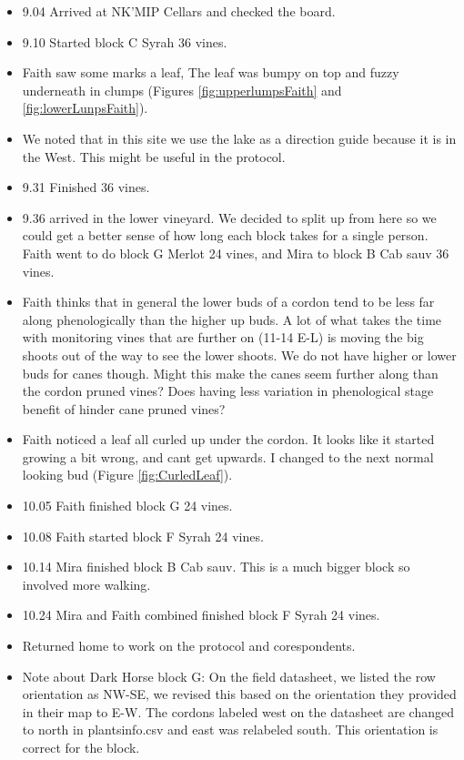 \documentclass[11pt,letter]{article}
\newenvironment{smitemize}{
\begin{itemize}
  \setlength{\itemsep}{0pt}
  \setlength{\parskip}{0.8pt}
  \setlength{\parsep}{0pt}}
{\end{itemize}
}
\begin{document}
\begin{smitemize}
\item 9.04 Arrived at NK'MIP Cellars and checked the board. 
\item 9.10 Started block C Syrah 36 vines.
\item Faith saw some marks a leaf, The leaf was bumpy on top and fuzzy underneath in clumps (Figures \ref{fig:upperlumpsFaith} and \ref{fig:lowerLunpsFaith}).
\item We noted that in this site we use the lake as a direction guide because it is in the West. This might be useful in the protocol. 
\item 9.31 Finished 36 vines.  
\item 9.36 arrived in the lower vineyard. We decided to split up from here so we could get a better sense of how long each block takes for a single person. Faith went to do block G Merlot 24 vines, and Mira to block B Cab sauv 36 vines. 
\item Faith thinks that in general the lower buds of a cordon tend to be less far along phenologically than the higher up buds. A lot of what takes the time with monitoring vines that are further on (11-14 E-L) is moving the big shoots out of the way to see the lower shoots. We do not have higher or lower buds for canes though. Might this make the canes seem further along than the cordon pruned vines? Does having less variation in phenological stage benefit of hinder cane pruned vines?
\item Faith noticed a leaf all curled up under the cordon. It looks like it started growing a bit wrong, and cant get upwards. I changed to the next normal looking bud (Figure \ref{fig:CurledLeaf}).
\item 10.05 Faith finished block G 24 vines.
\item 10.08 Faith started block F Syrah 24 vines.
\item 10.14 Mira finished block B Cab sauv. This is a much bigger block so involved more walking. 
\item 10.24 Mira and Faith combined finished block F Syrah 24 vines.
\item Returned home to work on the protocol and corespondents.  \\
\item Note about Dark Horse block G: On the field datasheet, we listed the row orientation as NW-SE, we revised this based on the orientation they provided in their map to E-W. The cordons labeled west on the datasheet are changed to north in plantsinfo.csv and east was relabeled south. This orientation is correct for the block.


\end{smitemize}
\end{document}
